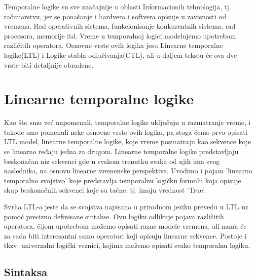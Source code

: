 \documentclass[a4paper]{article}
\begin{document}
{	Temporalne logike su sve značajnije u oblasti Informacionih tehnologija, tj. računarstvu, jer se ponašanje i hardvera i softvera opisuje u zavisnosti od vremena. Rad operativnih sistema, funkcionisanje konkurentnih sistema, rad procesora, memorije itd. Vreme u temporalnoj logici modelujemo upotrebom različitih operatora. Osnovne vrste ovih logika jesu Linearne temporalne logike(LTL) i Logike stabla odlučivanja(CTL), ali u daljem tekstu će ova dve vrste biti detaljnije obrađene.

	\newpage
	\section{Linearne temporalne logike}
	\label{sec:LTL}

	\newline
	Kao što smo već napomenuli, temporalne logike uključuju u razmatranje  vreme, i takođe smo pomenuli neke osnovne vrste ovih logika, pa stoga ćemo prvo opisati LTL model, linearne temporalne logike, koje vreme posmatraju kao sekvence koje se linearno ređaju jedna za drugom. Linearne temporalne logike predstavljaju beskonačan niz sekvenci gde u svakom trenutku svaka od njih ima svog naslednika, na osnovu linearne vremenske perspektive. Uvodimo i pojam 'linearno temporalno svojstvo' koje predstavlja temporalnu logičku formulu koja opisuje skup beskonačnih sekvenci koje su tačne, tj. imaju vrednost 'True'.\newline

	Svrha LTL-a jeste da se svojstva napisana u prirodnom jeziku prevedu u LTL uz pomoć precizno definisane sintakse. Ovu logiku odlikuje pojava različitih operatora, čijom upotrebom možemo opisati razne modele vremena, ali nama će za sada biti interesantni samo operatori koji opisuju linearne sekvence. Postoje i tkzv. univerzalni logički veznici, kojima možemo opisati svako temporalnu logiku.\newline
	\subsection{Sintaksa}
	\label{subsec:podnaslovN}
	\newline
	\newline
	
}
\end{document}
